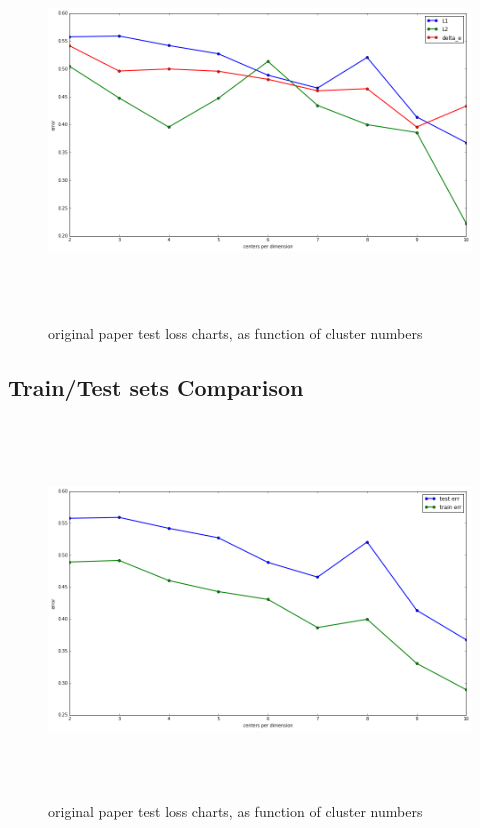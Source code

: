 \begin{figure}[H] 
	\includegraphics[width=\linewidth,height=10cm,keepaspectratio]{Figures/regs}
	\caption[orig res]
	{original paper test loss charts, as function of cluster numbers}
	\label{original paper results}			
\end{figure}


\subsection{Train/Test sets Comparison}

\begin{figure}[H] 
	\includegraphics[width=\linewidth,height=10cm,keepaspectratio]{Figures/train_test}
	\caption[orig res]
	{original paper test loss charts, as function of cluster numbers}
	\label{original paper results}			
\end{figure}


